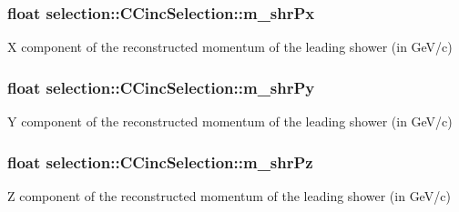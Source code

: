 \subsubsection[{\texorpdfstring{m\+\_\+shr\+Px}{m_shrPx}}]{\setlength{\rightskip}{0pt plus 5cm}float selection\+::\+C\+Cinc\+Selection\+::m\+\_\+shr\+Px\hspace{0.3cm}{\ttfamily [private]}}\hypertarget{classselection_1_1CCincSelection_a9a4858dd265bafd929aca940a2bc1342}{}\label{classselection_1_1CCincSelection_a9a4858dd265bafd929aca940a2bc1342}
X component of the reconstructed momentum of the leading shower (in Ge\+V/c) 
\subsubsection[{\texorpdfstring{m\+\_\+shr\+Py}{m_shrPy}}]{\setlength{\rightskip}{0pt plus 5cm}float selection\+::\+C\+Cinc\+Selection\+::m\+\_\+shr\+Py\hspace{0.3cm}{\ttfamily [private]}}\hypertarget{classselection_1_1CCincSelection_af38a589c58d27b98779c05fe6ad078c7}{}\label{classselection_1_1CCincSelection_af38a589c58d27b98779c05fe6ad078c7}
Y component of the reconstructed momentum of the leading shower (in Ge\+V/c) 
\subsubsection[{\texorpdfstring{m\+\_\+shr\+Pz}{m_shrPz}}]{\setlength{\rightskip}{0pt plus 5cm}float selection\+::\+C\+Cinc\+Selection\+::m\+\_\+shr\+Pz\hspace{0.3cm}{\ttfamily [private]}}\hypertarget{classselection_1_1CCincSelection_a8379b0c7d0b8a8d0b62ff0b353505146}{}\label{classselection_1_1CCincSelection_a8379b0c7d0b8a8d0b62ff0b353505146}
Z component of the reconstructed momentum of the leading shower (in Ge\+V/c) 
